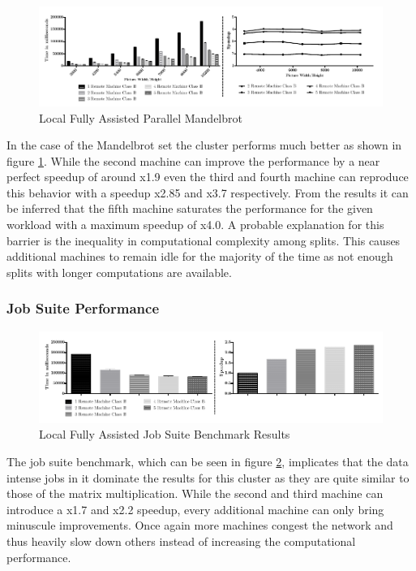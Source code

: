\begin{figure}[H]
	
	\includegraphics[width=1.0\textwidth]{images/local_fully_assisted_mandelbrot.pdf}
	\centering
	\caption{Local Fully Assisted Parallel Mandelbrot}
	\label{img:fully_assisted_parallel_mandelbrot}
\end{figure}

In the case of the Mandelbrot set the cluster performs much better as shown in figure \ref{img:fully_assisted_parallel_mandelbrot}. While the second machine can improve the performance by a near perfect speedup of around x1.9 even the third and fourth machine can reproduce this behavior with a speedup x2.85 and x3.7 respectively. From the results it can be inferred that the fifth machine saturates the performance for the given workload with a maximum speedup of x4.0. A probable explanation for this barrier is the inequality in computational complexity among splits. This causes additional machines to remain idle for the majority of the time as not enough splits with longer computations are available.

\subsubsection*{Job Suite Performance}

\begin{figure}[H]
	
	\includegraphics[width=1.0\textwidth]{images/local_fully_assisted_full_benchmark.pdf}
	\centering
	\caption{Local Fully Assisted Job Suite Benchmark Results}
	\label{img:local_fully_assisted_benchmark_results}
\end{figure}

The job suite benchmark, which can be seen in figure \ref{img:local_fully_assisted_benchmark_results}, implicates that the data intense jobs in it dominate the results for this cluster as they are quite similar to those of the matrix multiplication. While the second and third machine can introduce a x1.7 and x2.2 speedup, every additional machine can only bring minuscule improvements. Once again more machines congest the network and thus heavily slow down others instead of increasing the computational performance.

